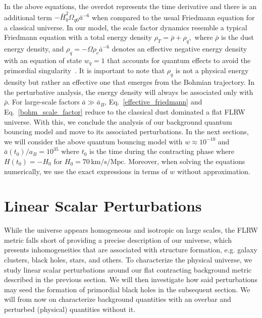 \documentclass[a4paper,11pt]{article}
\begin{document}
In the above equations, the overdot represents the time derivative and there is an additional term
$-\bar{H}^{2}_{0}\Omega_{q0}\bar{a}^{-6}$ when compared to the usual Friedmann equation
for a classical universe. In our model, the scale factor dynamics resemble
a typical Friedmann equation with a total energy density $\rho_{T} = \bar{\rho} +
	\rho_{q},$ where $\bar{\rho}$ is the dust energy density, and $\rho_{q} = -\Omega
	\rho_{c} \bar{a}^{-6}$ denotes an effective negative energy density with an equation of
state $w_q = 1$ that accounts for quantum effects to avoid the primordial
singularity~\cite{vitenti2012large}. It is important to note that $\rho_{q}$ is not a
physical energy density but rather an effective one that emerges from the Bohmian
trajectory. In the perturbative analysis, the energy density will always be associated
only with $\bar{\rho}$. For large-scale factors $\bar{a} \gg \bar{a}_{B} $,
Eq.~\eqref{effective_friedmann} and Eq.~\eqref{bohm_scale_factor} reduce to the
classical dust dominated a flat FLRW universe. With this, we conclude the analysis of
our background quantum bouncing model and move to its associated perturbations. In the
next sections, we will consider the above quantum bouncing model with $w\approx
	10^{-10}$ and $\bar{a}(t_0)/a_B = 10^{35}$ where $t_0$ is the time during the
contracting phase where $H(t_0) = -H_0$ for $H_0 = 70 \, \text{km/s/Mpc}$. Moreover,
when solving the equations numerically, we use the exact expressions in terms of $w$
without approximation.



\section{Linear Scalar Perturbations}
\label{linearpert}
While the universe appears homogeneous and isotropic on large scales, the FLRW metric falls short of providing a precise description of our universe, which presents inhomogeneities that are associated with structure formation, e.g. galaxy clusters, black holes, stars, and others. To characterize the physical universe, we study linear scalar perturbations around our flat contracting background metric described in the previous section. We will then investigate how said perturbations may seed the formation of primordial black holes in the subsequent section. We will from now on characterize background quantities with an overbar and perturbed (physical) quantities without it.
\end{document}

